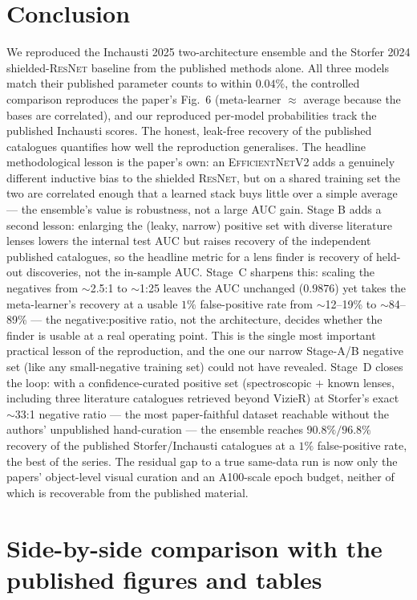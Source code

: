 \documentclass[11pt,letterpaper]{article}
\newcommand{\ResNet}{\textsc{ResNet}}
\newcommand{\EffNet}{\textsc{EfficientNetV2}}
\begin{document}
\section{Conclusion}

We reproduced the Inchausti 2025 two-architecture ensemble and the Storfer 2024
shielded-\ResNet{} baseline from the published methods alone. All three models
match their published parameter counts to within $0.04\%$, the controlled
comparison reproduces the paper's Fig.~6 (meta-learner $\approx$ average because
the bases are correlated), and our reproduced per-model probabilities track the
published Inchausti scores. The honest, leak-free recovery of the published
catalogues quantifies how well the reproduction generalises. The headline
methodological lesson is the paper's own: an \EffNet{} adds a genuinely different
inductive bias to the shielded \ResNet{}, but on a shared training set the two
are correlated enough that a learned stack buys little over a simple average ---
the ensemble's value is robustness, not a large AUC gain. Stage B adds a second
lesson: enlarging the (leaky, narrow) positive set with diverse literature lenses
lowers the internal test AUC but raises recovery of the independent published
catalogues, so the headline metric for a lens finder is recovery of held-out
discoveries, not the in-sample AUC. Stage~C sharpens this: scaling the negatives
from $\sim$2.5:1 to $\sim$1:25 leaves the AUC unchanged ($0.9876$) yet takes the
meta-learner's recovery at a usable $1\%$ false-positive rate from $\sim$12--19\%
to $\sim$84--89\% --- the negative:positive ratio, not the architecture, decides
whether the finder is usable at a real operating point. This is the single most
important practical lesson of the reproduction, and the one our narrow Stage-A/B
negative set (like any small-negative training set) could not have revealed.
Stage~D closes the loop: with a confidence-curated positive set (spectroscopic
$+$ known lenses, including three literature catalogues retrieved beyond VizieR)
at Storfer's exact $\sim$33:1 negative ratio --- the most paper-faithful dataset
reachable without the authors' unpublished hand-curation --- the ensemble reaches
$90.8\%/96.8\%$ recovery of the published Storfer/Inchausti catalogues at a $1\%$
false-positive rate, the best of the series. The residual gap to a true same-data
run is now only the papers' object-level visual curation and an A100-scale epoch
budget, neither of which is recoverable from the published material.

\appendix
\section{Side-by-side comparison with the published figures and tables}
\label{app:compare}
\end{document}
